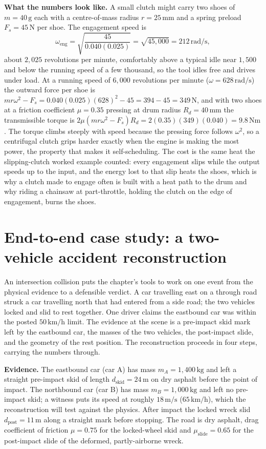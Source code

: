 \textbf{What the numbers look like.} A small clutch might carry two shoes
of $m=40\,\si{\gram}$ each with a centre-of-mass radius $r=25\,\si{
\milli\meter}$ and a spring preload $F_{s}=45\,\si{\newton}$ per shoe.
The engagement speed is
\[
\omega_{\text{eng}}=\sqrt{\frac{45}{0.040(0.025)}}=\sqrt{45{,}000}=212\,
\si{\radian\per\second},
\]
about $2{,}025$ revolutions per minute, comfortably above a typical idle
near $1{,}500$ and below the running speed of a few thousand, so the tool
idles free and drives under load. At a running speed of $6{,}000$
revolutions per minute ($\omega=628\,\si{\radian\per\second}$) the
outward force per shoe is $m r\omega^{2}-F_{s}=0.040(0.025)(628)^{2}-45=
394-45=349\,\si{\newton}$, and with two shoes at a friction coefficient
$\mu=0.35$ pressing at drum radius $R_{d}=40\,\si{\milli\meter}$ the
transmissible torque is $2\mu(m r\omega^{2}-F_{s})R_{d}=2(0.35)(349)(
0.040)=9.8\,\si{\newton\meter}$. The torque climbs steeply with speed
because the pressing force follows $\omega^{2}$, so a centrifugal clutch
grips harder exactly when the engine is making the most power, the
property that makes it self-scheduling. The cost is the same heat the
slipping-clutch worked example counted: every engagement slips while the
output speeds up to the input, and the energy lost to that slip heats the
shoes, which is why a clutch made to engage often is built with a heat
path to the drum and why riding a chainsaw at part-throttle, holding the
clutch on the edge of engagement, burns the shoes.

\section{End-to-end case study: a two-vehicle accident
reconstruction}

An intersection collision puts the chapter's tools to work on one
event from the physical evidence to a defensible verdict. A car
travelling east on a through road struck a car travelling north that
had entered from a side road; the two vehicles locked and slid to rest
together. One driver claims the eastbound car was within the posted
$50\,\si{\kilo\meter\per\hour}$ limit. The evidence at the scene is a
pre-impact skid mark left by the eastbound car, the masses of the two
vehicles, the post-impact slide, and the geometry of the rest
position. The reconstruction proceeds in four steps, carrying the
numbers through.

\textbf{Evidence.} The eastbound car (car A) has mass $m_{A}=1{,}400
\,\si{\kilogram}$ and left a straight pre-impact skid of length
$d_{\text{skid}}=24\,\si{\meter}$ on dry asphalt before the point of
impact. The northbound car (car B) has mass $m_{B}=1{,}000\,\si{
\kilogram}$ and left no pre-impact skid; a witness puts its speed at
roughly $18\,\si{\meter\per\second}$ ($65\,\si{\kilo\meter\per\hour}$),
which the reconstruction will test against the physics. After impact
the locked wreck slid $d_{\text{post}}=11\,\si{\meter}$ along a
straight mark before stopping. The road is dry asphalt, drag
coefficient of friction $\mu=0.75$ for the locked-wheel skid and
$\mu_{\text{slide}}=0.65$ for the post-impact slide of the deformed,
partly-airborne wreck.


